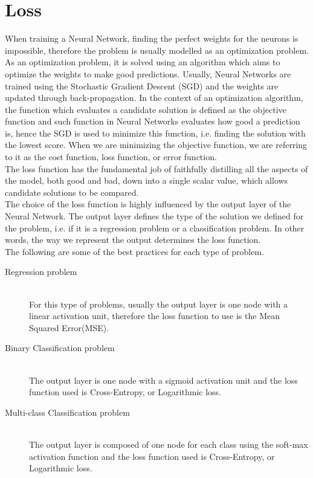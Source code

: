\section{Loss}
When training a Neural Network, finding the perfect weights for the neurons is impossible, therefore the problem is usually modelled as an optimization problem. As an optimization problem, it is solved using an algorithm which aims to optimize the weights to make good predictions. Usually, Neural Networks are trained using the Stochastic Gradient Descent (SGD) and the weights are updated through back-propagation. In the context of an optimization algorithm, the function which evaluates a candidate solution is defined as the objective function and such function in Neural Networks evaluates how good a prediction is, hence the SGD is used to minimize this function, i.e. finding the solution with the lowest score. 
When we are minimizing the objective function, we are referring to it as the cost function, loss function, or error function. \cite{Goodfellow-et-al-2016}\\
The loss function has the fundamental job of faithfully distilling all the aspects of the model, both good and bad, down into a single scalar value, which allows candidate solutions to be compared. \cite{reed_neural_1999}\\
The choice of the loss function is highly influenced by the output layer of the Neural Network. The output layer defines the type of the solution we defined for the problem, i.e. if it is a regression problem or a classification problem. In other words, the way we  represent the output determines the loss function. \cite{Goodfellow-et-al-2016}\\
The following are some of the best practices for each type of problem. 

\begin{description}
  \item[Regression problem] \hfill\\ 
  For this type of problems, usually the output layer is one node with a linear activation unit, therefore the loss function to use is the Mean Squared Error(MSE). 
  \item[Binary Classification problem] \hfill\\ 
  The output layer is one node with a sigmoid activation unit and the loss function used is Cross-Entropy, or Logarithmic loss. 
  \item[Multi-class Classification problem] \hfill\\ 
  The output layer is composed of one node for each class using the soft-max activation function and the loss function used is Cross-Entropy, or Logarithmic loss. 
\end{description}


